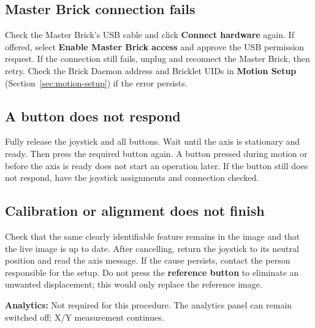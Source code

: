 \documentclass[a4paper,11pt]{article}
\newcommand{\ReferenceButton}{\textbf{reference button}}
\begin{document}
\subsection{Master Brick connection fails}
\label{sec:connection-issues}

Check the Master Brick's USB cable and click \textbf{Connect hardware} again.
If offered, select \textbf{Enable Master Brick access} and approve the USB
permission request. If the connection still fails, unplug and reconnect the
Master Brick, then retry. Check the Brick Daemon address and Bricklet UIDs in
\textbf{Motion Setup} (Section~\ref{sec:motion-setup}) if the error persists.

\subsection{A button does not respond}

Fully release the joystick and all buttons. Wait until the axis is stationary
and ready. Then press the required button again. A button pressed during
motion or before the axis is ready does not start an operation later. If the
button still does not respond, have the joystick assignments and connection
checked.

\subsection{Calibration or alignment does not finish}

Check that the same clearly identifiable feature remains in the image and
that the live image is up to date. After cancelling, return the joystick to
its neutral position and read the axis message. If the cause persists,
contact the person responsible for the setup. Do not press the
\ReferenceButton{} to eliminate an unwanted displacement; this would only
replace the reference image.

\smallskip
\textbf{Analytics:} Not required for this procedure. The analytics panel can
remain switched off; X/Y measurement continues.

\label{LastPage}
\end{document}
